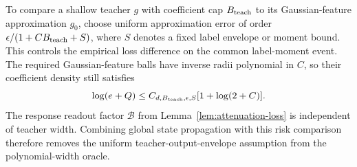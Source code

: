 To compare a shallow teacher $g$ with coefficient cap $B_{\rm teach}$ to its Gaussian-feature approximation $g_0$, choose uniform approximation error of order
$\epsilon/(1+CB_{\rm teach}+S)$, where $S$ denotes a fixed label envelope or moment bound. This controls the empirical loss difference on the common label-moment event. The required Gaussian-feature balls have inverse radii polynomial in $C$, so their coefficient density still satisfies
\[
 \log(e+Q)\le C_{d,B_{\rm teach},\epsilon,S}[1+\log(2+C)].
\]
The response readout factor $\mathcal B$ from Lemma~\ref{lem:attenuation-loss} is independent of teacher width. Combining global state propagation with this risk comparison therefore removes the uniform teacher-output-envelope assumption from the polynomial-width oracle.
